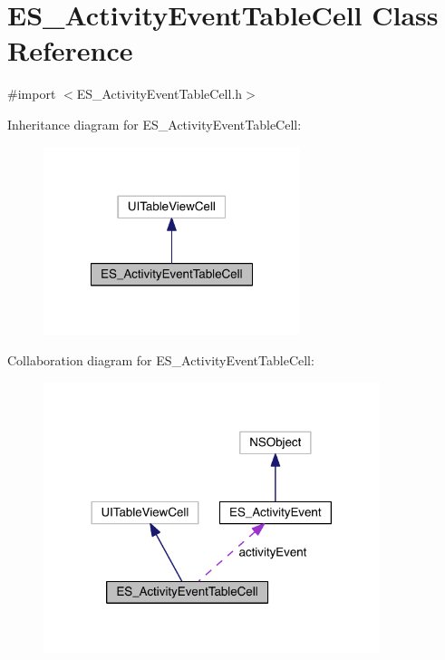 \hypertarget{interface_e_s___activity_event_table_cell}{\section{E\+S\+\_\+\+Activity\+Event\+Table\+Cell Class Reference}
\label{interface_e_s___activity_event_table_cell}
}


{\ttfamily \#import $<$E\+S\+\_\+\+Activity\+Event\+Table\+Cell.\+h$>$}



Inheritance diagram for E\+S\+\_\+\+Activity\+Event\+Table\+Cell\+:\nopagebreak
\begin{figure}[H]
\begin{center}
\leavevmode
\includegraphics[width=212pt]{d0/d40/interface_e_s___activity_event_table_cell__inherit__graph}
\end{center}
\end{figure}


Collaboration diagram for E\+S\+\_\+\+Activity\+Event\+Table\+Cell\+:\nopagebreak
\begin{figure}[H]
\begin{center}
\leavevmode
\includegraphics[width=278pt]{dd/dcb/interface_e_s___activity_event_table_cell__coll__graph}
\end{center}
\end{figure}

